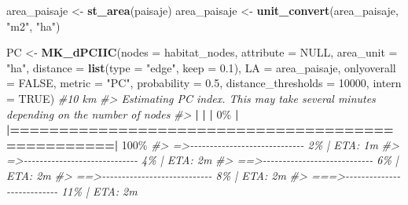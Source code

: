 \documentclass[
]{book}
\newenvironment{Shaded}{\begin{snugshade}}{\end{snugshade}}
\newcommand{\AttributeTok}[1]{\textcolor[rgb]{0.13,0.29,0.53}{#1}}
\newcommand{\CommentTok}[1]{\textcolor[rgb]{0.56,0.35,0.01}{\textit{#1}}}
\newcommand{\ConstantTok}[1]{\textcolor[rgb]{0.56,0.35,0.01}{#1}}
\newcommand{\DecValTok}[1]{\textcolor[rgb]{0.00,0.00,0.81}{#1}}
\newcommand{\ErrorTok}[1]{\textcolor[rgb]{0.64,0.00,0.00}{\textbf{#1}}}
\newcommand{\FloatTok}[1]{\textcolor[rgb]{0.00,0.00,0.81}{#1}}
\newcommand{\FunctionTok}[1]{\textcolor[rgb]{0.13,0.29,0.53}{\textbf{#1}}}
\newcommand{\NormalTok}[1]{#1}
\newcommand{\OtherTok}[1]{\textcolor[rgb]{0.56,0.35,0.01}{#1}}
\newcommand{\SpecialCharTok}[1]{\textcolor[rgb]{0.81,0.36,0.00}{\textbf{#1}}}
\newcommand{\StringTok}[1]{\textcolor[rgb]{0.31,0.60,0.02}{#1}}
\begin{document}
\begin{Shaded}
\begin{Highlighting}[]
\NormalTok{area\_paisaje }\OtherTok{\textless{}{-}} \FunctionTok{st\_area}\NormalTok{(paisaje) }
\NormalTok{area\_paisaje }\OtherTok{\textless{}{-}} \FunctionTok{unit\_convert}\NormalTok{(area\_paisaje, }\StringTok{"m2"}\NormalTok{, }\StringTok{"ha"}\NormalTok{) }

\NormalTok{PC }\OtherTok{\textless{}{-}} \FunctionTok{MK\_dPCIIC}\NormalTok{(}\AttributeTok{nodes =}\NormalTok{ habitat\_nodes,}
                \AttributeTok{attribute =} \ConstantTok{NULL}\NormalTok{,}
                \AttributeTok{area\_unit =} \StringTok{"ha"}\NormalTok{,}
                \AttributeTok{distance =} \FunctionTok{list}\NormalTok{(}\AttributeTok{type =} \StringTok{"edge"}\NormalTok{, }\AttributeTok{keep =} \FloatTok{0.1}\NormalTok{),}
                \AttributeTok{LA =}\NormalTok{ area\_paisaje,}
                \AttributeTok{onlyoverall =} \ConstantTok{FALSE}\NormalTok{,}
                \AttributeTok{metric =} \StringTok{"PC"}\NormalTok{,}
                \AttributeTok{probability =} \FloatTok{0.5}\NormalTok{,}
                \AttributeTok{distance\_thresholds =} \DecValTok{10000}\NormalTok{,}
                \AttributeTok{intern =} \ConstantTok{TRUE}\NormalTok{) }\CommentTok{\#10 km}
\CommentTok{\#\textgreater{} Estimating PC index. This may take several minutes depending on the number of nodes}
\CommentTok{\#\textgreater{} }
  \SpecialCharTok{|}                                                        
  \ErrorTok{|}                                                  \ErrorTok{|}   \DecValTok{0}\NormalTok{\%}
  \SpecialCharTok{|}                                                        
  \ErrorTok{|==================================================|} \DecValTok{100}\NormalTok{\%}
\CommentTok{\#\textgreater{}  =\textgreater{}{-}{-}{-}{-}{-}{-}{-}{-}{-}{-}{-}{-}{-}{-}{-}{-}{-}{-}{-}{-}{-}{-}{-}{-}{-}{-}{-}{-}{-}    2\% |  ETA:  1m}
\CommentTok{\#\textgreater{}  =\textgreater{}{-}{-}{-}{-}{-}{-}{-}{-}{-}{-}{-}{-}{-}{-}{-}{-}{-}{-}{-}{-}{-}{-}{-}{-}{-}{-}{-}{-}{-}    4\% |  ETA:  2m}
\CommentTok{\#\textgreater{}  ==\textgreater{}{-}{-}{-}{-}{-}{-}{-}{-}{-}{-}{-}{-}{-}{-}{-}{-}{-}{-}{-}{-}{-}{-}{-}{-}{-}{-}{-}{-}    6\% |  ETA:  2m}
\CommentTok{\#\textgreater{}  ==\textgreater{}{-}{-}{-}{-}{-}{-}{-}{-}{-}{-}{-}{-}{-}{-}{-}{-}{-}{-}{-}{-}{-}{-}{-}{-}{-}{-}{-}{-}    8\% |  ETA:  2m}
\CommentTok{\#\textgreater{}  ===\textgreater{}{-}{-}{-}{-}{-}{-}{-}{-}{-}{-}{-}{-}{-}{-}{-}{-}{-}{-}{-}{-}{-}{-}{-}{-}{-}{-}{-}   11\% |  ETA:  2m}

\end{Highlighting}
\end{Shaded}
\end{document}
